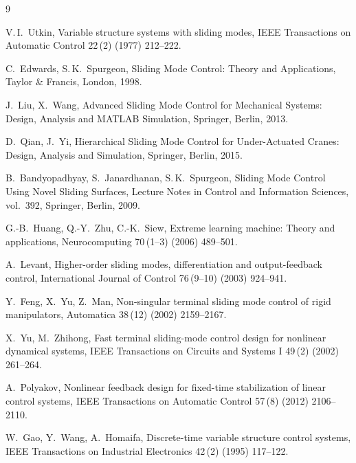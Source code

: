 \documentclass[preprint,12pt]{elsarticle}
\begin{document}

\begin{thebibliography}{9}

V.\,I.~Utkin,
Variable structure systems with sliding modes,
IEEE Transactions on Automatic Control 22\,(2) (1977) 212--222.

C.~Edwards, S.\,K.~Spurgeon,
Sliding Mode Control: Theory and Applications,
Taylor \& Francis, London, 1998.

J.~Liu, X.~Wang,
Advanced Sliding Mode Control for Mechanical Systems: Design, Analysis and MATLAB Simulation,
Springer, Berlin, 2013.

D.~Qian, J.~Yi,
Hierarchical Sliding Mode Control for Under-Actuated Cranes: Design, Analysis and Simulation,
Springer, Berlin, 2015.

B.~Bandyopadhyay, S.~Janardhanan, S.\,K.~Spurgeon,
Sliding Mode Control Using Novel Sliding Surfaces,
Lecture Notes in Control and Information Sciences, vol.~392, Springer, Berlin, 2009.

G.-B.~Huang, Q.-Y.~Zhu, C.-K.~Siew,
Extreme learning machine: Theory and applications,
Neurocomputing 70\,(1--3) (2006) 489--501.

A.~Levant,
Higher-order sliding modes, differentiation and output-feedback control,
International Journal of Control 76\,(9--10) (2003) 924--941.

Y.~Feng, X.~Yu, Z.~Man,
Non-singular terminal sliding mode control of rigid manipulators,
Automatica 38\,(12) (2002) 2159--2167.

X.~Yu, M.~Zhihong,
Fast terminal sliding-mode control design for nonlinear dynamical systems,
IEEE Transactions on Circuits and Systems I 49\,(2) (2002) 261--264.

A.~Polyakov,
Nonlinear feedback design for fixed-time stabilization of linear control systems,
IEEE Transactions on Automatic Control 57\,(8) (2012) 2106--2110.

W.~Gao, Y.~Wang, A.~Homaifa,
Discrete-time variable structure control systems,
IEEE Transactions on Industrial Electronics 42\,(2) (1995) 117--122.


\end{thebibliography}
\end{document}
